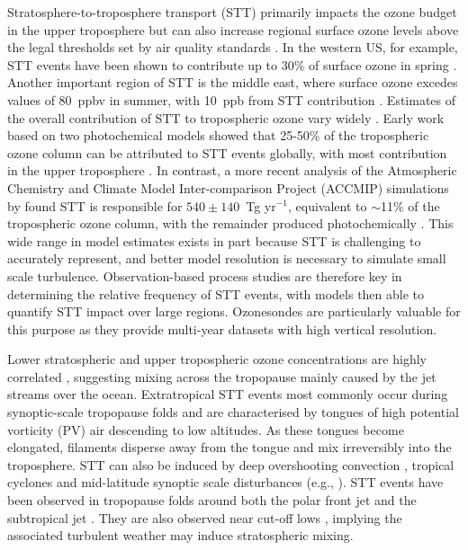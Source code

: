 Stratosphere-to-troposphere transport (STT) primarily impacts the ozone budget in the upper troposphere but can also increase regional surface ozone levels above the legal thresholds set by air quality standards \citep{Danielson1968, Lelieveld2009, Lefohn2011, Langford2012, Zhang2014}.
In the western US, for example, STT events have been shown to contribute up to 30\% of surface ozone in spring \citep{Lin2012}.
Another important region of STT is the middle east, where surface ozone excedes values of 80~ppbv in summer, with 10~ppb from STT contribution \citep{Lelieveld2009}.%
Estimates of the overall contribution of STT to tropospheric ozone vary widely \citep[e.g.,][]{Galani2003, Stohl2003, Stevenson2006, Lefohn2011}.
Early work based on two photochemical models showed that 25-50\% of the tropospheric ozone column can be attributed to STT events globally, with most contribution in the upper troposphere \citep{Stohl2003}.
In contrast, a more recent analysis of the Atmospheric Chemistry and Climate Model Inter-comparison Project (ACCMIP) simulations by \citet{Young2013} found STT is responsible for $540\pm140$~Tg yr$^{-1}$, equivalent to $\sim$11\% of the tropospheric ozone column, with the remainder produced photochemically \citep{Monks2015}.
This wide range in model estimates exists in part because STT is challenging to accurately represent, and better model resolution is necessary to simulate small scale turbulence.
Observation-based process studies are therefore key in determining the relative frequency of STT events, with models then able to quantify STT impact over large regions.
Ozonesondes are particularly valuable for this purpose as they provide multi-year datasets with high vertical resolution.

Lower stratospheric and upper tropospheric ozone concentrations are highly correlated \citep{Terao2008}, suggesting mixing across the tropopause mainly caused by the jet streams over the ocean.
Extratropical STT events most commonly occur during synoptic-scale tropopause folds \citep{Sprenger2003, Tang2012, Frey2015} and are characterised by tongues of high potential vorticity (PV) air descending to low altitudes.
As these tongues become elongated, filaments disperse away from the tongue and mix irreversibly into the troposphere.
STT can also be induced by deep overshooting convection \citep{Frey2015}, tropical cyclones \citep{Das2016} and mid-latitude synoptic scale disturbances (e.g., \citet{Stohl2003, Mihalikova2012}). 
STT events have been observed in tropopause folds around both the polar front jet \citep{Vaughan1994, Beekmann1997} and the subtropical jet \citep{Baray2000}.
They are also observed near cut-off lows \citep{Price1993, Wirth1995}, implying the associated turbulent weather may induce stratospheric mixing.


